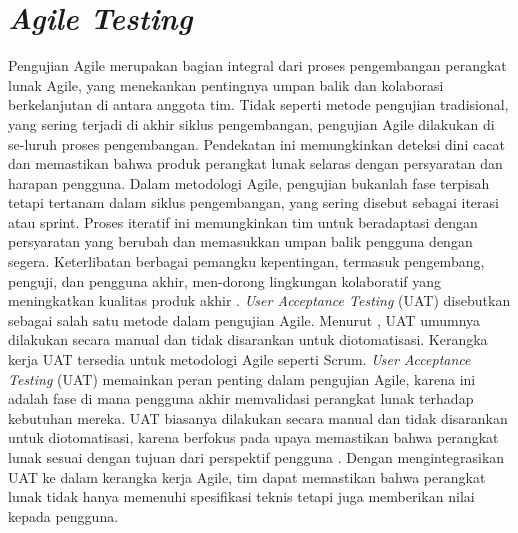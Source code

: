 \section{\textit{Agile Testing}}

Pengujian Agile merupakan bagian integral dari proses pengembangan perangkat lunak Agile, yang menekankan pentingnya umpan balik dan kolaborasi berkelanjutan di antara anggota tim. Tidak seperti metode pengujian tradisional, yang sering terjadi di akhir siklus pengembangan, pengujian Agile dilakukan di se-luruh proses pengembangan. Pendekatan ini memungkinkan deteksi dini cacat dan memastikan bahwa produk perangkat lunak selaras dengan persyaratan dan harapan pengguna.
\singlespacing{}
Dalam metodologi Agile, pengujian bukanlah fase terpisah tetapi tertanam dalam siklus pengembangan, yang sering disebut sebagai iterasi atau sprint. Proses iteratif ini memungkinkan tim untuk beradaptasi dengan persyaratan yang berubah dan memasukkan umpan balik pengguna dengan segera. Keterlibatan berbagai pemangku kepentingan, termasuk pengembang, penguji, dan pengguna akhir, men-dorong lingkungan kolaboratif yang meningkatkan kualitas produk akhir \citep{pandit2015agileuat}. \textit{User Acceptance Testing} (UAT) disebutkan sebagai salah satu metode dalam pengujian Agile. Menurut \citet{pandit2015agileuat}, UAT umumnya dilakukan secara manual dan tidak disarankan untuk diotomatisasi. Kerangka kerja UAT tersedia untuk metodologi Agile seperti Scrum.
\singlespacing{}
\textit{User Acceptance Testing} (UAT) memainkan peran penting dalam pengujian Agile, karena ini adalah fase di mana pengguna akhir memvalidasi perangkat lunak terhadap kebutuhan mereka. UAT biasanya dilakukan secara manual dan tidak disarankan untuk diotomatisasi, karena berfokus pada upaya memastikan bahwa perangkat lunak sesuai dengan tujuan dari perspektif pengguna \citep{pandit2015agileuat}. Dengan mengintegrasikan UAT ke dalam kerangka kerja Agile, tim dapat memastikan bahwa perangkat lunak tidak hanya memenuhi spesifikasi teknis tetapi juga memberikan nilai kepada pengguna.

